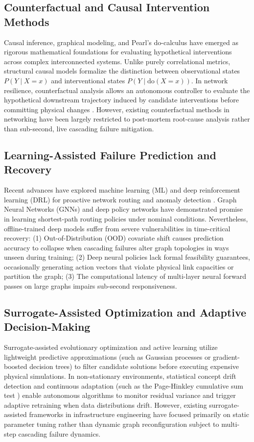 \documentclass[pdflatex,sn-mathphys-num]{sn-jnl}
\theoremstyle{thmstyleone}
\theoremstyle{thmstyletwo}
\theoremstyle{thmstylethree}
\begin{document}
\subsection{Counterfactual and Causal Intervention Methods}
Causal inference, graphical modeling, and Pearl's do-calculus \cite{pearl2009causality,spirtes2000causation} have emerged as rigorous mathematical foundations for evaluating hypothetical interventions across complex interconnected systems. Unlike purely correlational metrics, structural causal models formalize the distinction between observational states $P(Y \mid X = x)$ and interventional states $P(Y \mid \mathrm{do}(X = x))$. In network resilience, counterfactual analysis allows an autonomous controller to evaluate the hypothetical downstream trajectory induced by candidate interventions before committing physical changes \cite{kephart2003vision}. However, existing counterfactual methods in networking have been largely restricted to post-mortem root-cause analysis rather than sub-second, live cascading failure mitigation.

\subsection{Learning-Assisted Failure Prediction and Recovery}
Recent advances have explored machine learning (ML) and deep reinforcement learning (DRL) for proactive network routing and anomaly detection \cite{chen2021generative}. Graph Neural Networks (GNNs) and deep policy networks have demonstrated promise in learning shortest-path routing policies under nominal conditions. Nevertheless, offline-trained deep models suffer from severe vulnerabilities in time-critical recovery: (1) Out-of-Distribution (OOD) covariate shift causes prediction accuracy to collapse when cascading failures alter graph topologies in ways unseen during training; (2) Deep neural policies lack formal feasibility guarantees, occasionally generating action vectors that violate physical link capacities or partition the graph; (3) The computational latency of multi-layer neural forward passes on large graphs impairs sub-second responsiveness.

\subsection{Surrogate-Assisted Optimization and Adaptive Decision-Making}
Surrogate-assisted evolutionary optimization and active learning \cite{forrester2009recent} utilize lightweight predictive approximations (such as Gaussian processes or gradient-boosted decision trees) to filter candidate solutions before executing expensive physical simulations. In non-stationary environments, statistical concept drift detection and continuous adaptation \cite{gama2014survey} (such as the Page-Hinkley cumulative sum test \cite{page1954continuous}) enable autonomous algorithms to monitor residual variance and trigger adaptive retraining when data distributions drift. However, existing surrogate-assisted frameworks in infrastructure engineering have focused primarily on static parameter tuning rather than dynamic graph reconfiguration subject to multi-step cascading failure dynamics.
\end{document}
